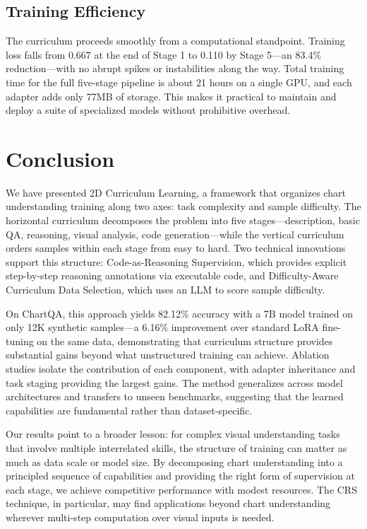 ﻿\documentclass[journal]{IEEEtran}
\newcommand{\fullmethod}{2D Curriculum Learning}
\newcommand{\crs}{CRS}
\begin{document}
\subsection{Training Efficiency}
The curriculum proceeds smoothly from a computational standpoint. Training loss falls from 0.667 at the end of Stage 1 to 0.110 by Stage 5---an 83.4\% reduction---with no abrupt spikes or instabilities along the way. Total training time for the full five-stage pipeline is about 21 hours on a single GPU, and each adapter adds only 77MB of storage. This makes it practical to maintain and deploy a suite of specialized models without prohibitive overhead.

\section{Conclusion}
We have presented \fullmethod{}, a framework that organizes chart understanding training along two axes: task complexity and sample difficulty. The horizontal curriculum decomposes the problem into five stages---description, basic QA, reasoning, visual analysis, code generation---while the vertical curriculum orders samples within each stage from easy to hard. Two technical innovations support this structure: Code-as-Reasoning Supervision, which provides explicit step-by-step reasoning annotations via executable code, and Difficulty-Aware Curriculum Data Selection, which uses an LLM to score sample difficulty.

On ChartQA, this approach yields 82.12\% accuracy with a 7B model trained on only 12K synthetic samples---a 6.16\% improvement over standard LoRA fine-tuning on the same data, demonstrating that curriculum structure provides substantial gains beyond what unstructured training can achieve. Ablation studies isolate the contribution of each component, with adapter inheritance and task staging providing the largest gains. The method generalizes across model architectures and transfers to unseen benchmarks, suggesting that the learned capabilities are fundamental rather than dataset-specific.

Our results point to a broader lesson: for complex visual understanding tasks that involve multiple interrelated skills, the structure of training can matter as much as data scale or model size. By decomposing chart understanding into a principled sequence of capabilities and providing the right form of supervision at each stage, we achieve competitive performance with modest resources. The \crs{} technique, in particular, may find applications beyond chart understanding wherever multi-step computation over visual inputs is needed.
\end{document}
